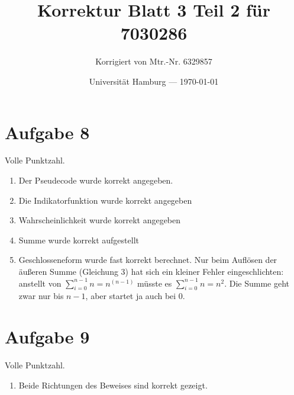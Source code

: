 \documentclass[parskip=half,a4paper]{scrartcl}
\title{Korrektur Blatt 3 Teil 2 für 7030286}
\author{Korrigiert von Mtr.-Nr. 6329857}
\date{Universität Hamburg --- \today}
\begin{document}
\maketitle %

\section{Aufgabe 8}

Volle Punktzahl.

\begin{enumerate}
    \item Der Pseudecode wurde korrekt angegeben.
    \item Die Indikatorfunktion wurde korrekt angegeben
    \item Wahrscheinlichkeit wurde korrekt angegeben
    \item Summe wurde korrekt aufgestellt
    \item Geschlosseneform wurde fast korrekt berechnet. Nur beim Auflösen der äußeren Summe (Gleichung 3) hat sich ein kleiner Fehler eingeschlichten: anstellt von $\sum_{i=0}^{n-1}{n} = n^(n-1)$ müsste es $\sum_{i=0}^{n-1}{n} = n^2$. Die Summe geht zwar nur bis $n-1$, aber startet ja auch bei $0$.
\end{enumerate}

\section{Aufgabe 9}

Volle Punktzahl.


\begin{enumerate}
    \item Beide Richtungen des Beweises sind korrekt gezeigt.
\end{enumerate}
\end{document}
